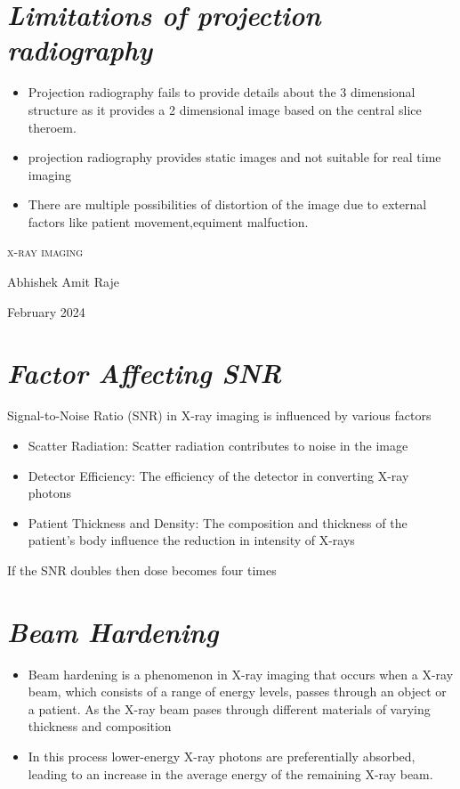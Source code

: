 \documentclass{article}
\begin{document}
\section{\textit{Limitations of projection radiography}}
\begin{itemize}
    \item Projection radiography fails to provide details about the 3 dimensional structure as it provides a 2 dimensional image based on the central slice theroem.
    \item  projection radiography provides static images and not suitable for real time imaging
    \item There are multiple possibilities of distortion of the image due to external factors like patient movement,equiment malfuction.
\end{itemize}
\newpage

\begin{center}
  {\scshape\LARGE x-ray imaging \par}
  \vspace{0.5cm}
  {\Large Abhishek Amit Raje \par}
  \vspace{0.5cm}
  {\large February 2024 \par}
\end{center}
\newpage
\setcounter{section}{0}
\section{\textit{Factor Affecting SNR}}
Signal-to-Noise Ratio (SNR) in X-ray imaging is influenced by various factors
\begin{itemize}
    \item Scatter Radiation: Scatter radiation contributes to noise in the image
    \item Detector Efficiency: The efficiency of the detector in converting X-ray photons 
    \item Patient Thickness and Density: The composition and thickness of the patient's body influence the reduction in intensity of X-rays
\end{itemize}
If the SNR doubles then dose becomes four times 
\section{\textit{Beam Hardening}}
\begin{itemize}
    \item 
Beam hardening is a phenomenon in X-ray imaging that occurs when a  X-ray beam, which consists of a range of energy levels, passes through an object or a patient. As the X-ray beam pases through different materials of varying thickness and composition
\item In this process lower-energy X-ray photons are preferentially absorbed, leading to an increase in the average energy of the remaining X-ray beam.
\end{itemize}
\end{document}
